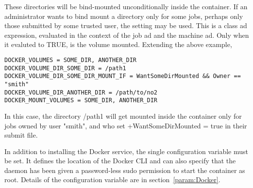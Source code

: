 These directories will be bind-mounted unconditionally inside the container.
If an administrator wants to bind mount a directory only for some jobs, perhaps
only those submitted by some trusted user, the setting
 may be used.  This is a class ad
expression, evaluated in the context of the job ad and the machine ad.  Only when it
evaluted to TRUE, is the volume mounted.  Extending the above example,

\begin{verbatim}
DOCKER_VOLUMES = SOME_DIR, ANOTHER_DIR
DOCKER_VOLUME_DIR_SOME_DIR = /path1
DOCKER_VOLUME_DIR_SOME_DIR_MOUNT_IF = WantSomeDirMounted && Owner == "smith"
DOCKER_VOLUME_DIR_ANOTHER_DIR = /path/to/no2
DOCKER_MOUNT_VOLUMES = SOME_DIR, ANOTHER_DIR
\end{verbatim}

In this case, the directory /path1 will get mounted inside the container only for jobs
owned by user "smith", and who set +WantSomeDirMounted = true in their submit file.


In addition to installing the Docker service, 
the single configuration variable  must be set.
It defines the location of the Docker CLI and can also specify that
the  daemon has been given a password-less sudo
permission to start the container as root.
Details of the  configuration variable are in
section~\ref{param:Docker}.

